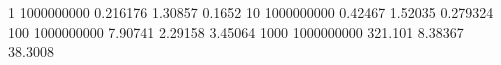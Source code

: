 1 1000000000 0.216176 1.30857 0.1652
10 1000000000 0.42467 1.52035 0.279324
100 1000000000 7.90741 2.29158 3.45064
1000 1000000000 321.101 8.38367 38.3008
